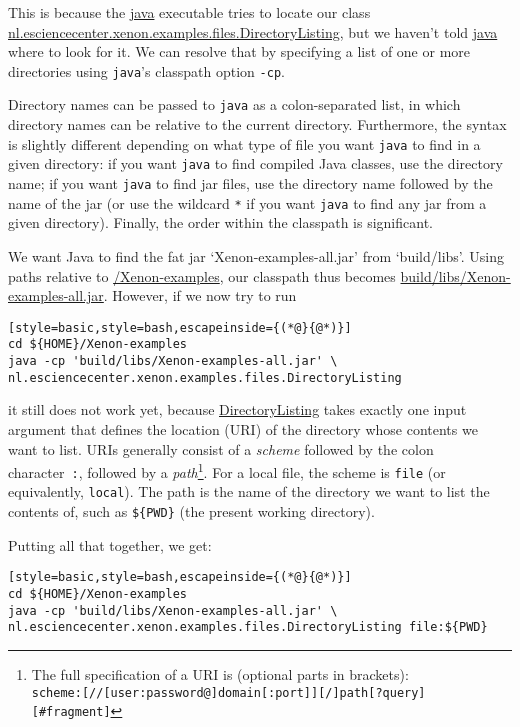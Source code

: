 This is because the \url{java} executable tries to locate our class \url{nl.esciencecenter.xenon.examples.files.DirectoryListing}, but we haven't told \url{java} where to look for it. We can resolve that by specifying a list of one or more directories using \texttt{java}'s classpath option \texttt{-cp}.

Directory names can be passed to \texttt{java} as a colon-separated list, in which directory names can be relative to the current directory. Furthermore, the syntax is slightly different depending on what type of file you want \texttt{java} to find in a given directory: if you want \texttt{java} to find compiled Java classes, use the directory name; if you want \texttt{java} to find jar files, use the directory name followed by the name of the jar (or use the wildcard \texttt{*} if you want \texttt{java} to find any jar from a given directory). Finally, the order within the classpath is significant.


We want Java to find the fat jar `Xenon-examples-all.jar' from `build/libs'. Using paths relative to \mytilde\url{/Xenon-examples}, our classpath thus becomes \url{build/libs/Xenon-examples-all.jar}. However, if we now try to run
\begin{lstlisting}[style=basic,style=bash,escapeinside={(*@}{@*)}]
cd ${HOME}/Xenon-examples
java -cp 'build/libs/Xenon-examples-all.jar' \
nl.esciencecenter.xenon.examples.files.DirectoryListing
\end{lstlisting}
it still does not work yet, because \url{DirectoryListing} takes exactly one input argument that defines the location (URI) of the directory whose contents we want to list. URIs generally consist of a \textit{scheme} followed by the colon character~\texttt{:}, followed by a \textit{path}\footnote{The full specification of a URI is (optional parts in brackets): \\ \texttt{scheme:[//[user:password@]domain[:port]][/]path[?query][#fragment]}}. For a local file, the scheme is \texttt{file} (or equivalently, \texttt{local}). The path is the name of the directory we want to list the contents of, such as \texttt{\$\{PWD\}} (the present working directory).

Putting all that together, we get:

\begin{lstlisting}[style=basic,style=bash,escapeinside={(*@}{@*)}]
cd ${HOME}/Xenon-examples
java -cp 'build/libs/Xenon-examples-all.jar' \
nl.esciencecenter.xenon.examples.files.DirectoryListing file:${PWD}
\end{lstlisting} %

